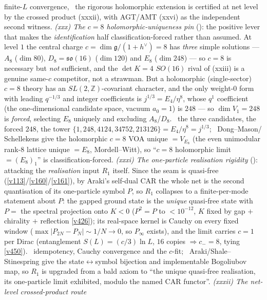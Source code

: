 \documentclass[11pt,a4paper]{article}
\begin{document}
\begin{keybox}
finite-$L$ convergence, \mC\mO\ the rigorous holomorphic extension is certified at net level by the crossed
product (xxxii), with AGT/AMT (xxvi) as the independent second witness. \emph{(xxx) The $c{=}8$
holomorphic-uniqueness pin} (): the positive lever that makes the
\emph{identification} half classification-forced rather than assumed. At level $1$ the central charge
$c{=}\dim\mathfrak g/(1{+}h^\vee){=}8$ has \emph{three} simple solutions --- $A_8$ ($\dim 80$), $D_8{=}\mathfrak{so}(16)$
($\dim 120$) and $E_8$ ($\dim 248$) --- so $c{=}8$ is necessary but \emph{not} sufficient, and the $\det K{=}4$
$SO(16)$ rival of (xxiii) is a genuine same-$c$ competitor, not a strawman. But a holomorphic (single-sector) $c{=}8$
theory has an $SL(2,\mathbb Z)$-covariant character, and the only weight-$0$ form with leading $q^{-1/3}$ and integer
coefficients is $j^{1/3}{=}E_4/\eta^8$, whose $q^1$ coefficient (the one-dimensional candidate space, vacuum $a_0{=}1$)
is $248$ --- so $\dim V_1{=}248$ is \emph{forced}, selecting $E_8$ uniquely and excluding $A_8$/$D_8$. \mE\ the three
candidates, the forced $248$, the tower $\{1,248,4124,34752,213126\}{=}E_4/\eta^8{=}j^{1/3}$; \mC\ Dong--Mason/
Schellekens give the holomorphic $c{=}8$ VOA unique $={}V_{E_8}$ (the even unimodular rank-$8$ lattice unique $={}E_8$,
Mordell--Witt), so ``$c{=}8$ holomorphic limit $={}(E_8)_1$'' is classification-forced. \emph{(xxxi) The one-particle
realisation rigidity} (): attacking the \emph{realisation} input $R_1$
itself. Since the seam is quasi-free (\vref{v113}/\vref{v160}/\vref{v161}), by Araki's self-dual CAR the whole net is
the second quantisation of its one-particle symbol $P$, so $R_1$ collapses to a finite-per-mode statement about $P$:
the gapped ground state is the \emph{unique} quasi-free state with $P{=}$ the spectral projection onto $K{<}0$
($P^2{=}P$ to $<10^{-12}$, $K$ fixed by gap $+$ chirality $+$ reflection \vref{v426}); its real-space kernel is Cauchy
on every fixed window ($\max|P_{2N}{-}P_N|{\sim}1/N{\to}0$, so $P_\infty$ exists), and the limit carries $c{=}1$ per
Dirac (entanglement $S(L){=}(c/3)\ln L$, $16$ copies $\Rightarrow c_-{=}8$, tying \vref{v450}). \mE\ idempotency,
Cauchy convergence and the $c$-fit; \mC\ Araki/Shale--Stinespring give the state$\leftrightarrow$symbol bijection and
implementable Bogoliubov map, so $R_1$ is upgraded from a bald axiom to ``the unique quasi-free realisation, its
one-particle limit exhibited, modulo the named CAR functor''. \emph{(xxxii) The net-level crossed-product route
}
\end{keybox}
\end{document}
